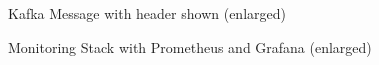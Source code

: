 \begin{figure}[htbp]
 \centering
 \caption{Kafka Message with header shown (enlarged)}
 \label{fig:appendix02:implementation:headerexample}
\end{figure}

\begin{figure}[htbp]
 \centering
 \caption{Monitoring Stack with Prometheus and Grafana (enlarged)}
 \label{fig:appendix02:metrics:prometheusstack}
\end{figure}

